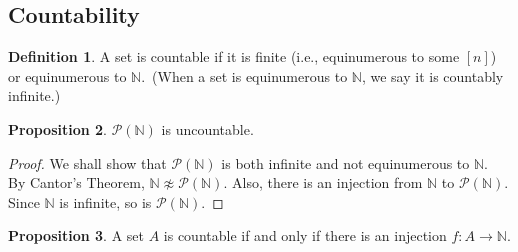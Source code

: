 \documentclass[14pt]{article}
\theoremstyle{definition}
\newtheorem{definition}{Definition}[subsection]
\newtheorem{proposition}[definition]{Proposition}
\newcommand{\fun}[3]{#1\colon #2\rightarrow#3}
\newcommand{\bb}[1]{\mathbb{#1}}
\begin{document}
\vspace{5mm}

\subsection{Countability}
\begin{definition}
    A set is countable if it is finite (i.e., equinumerous to some $[n]$) or equinumerous to $\bb{N}$.\
   (When a set is equinumerous to $\bb{N}$, we say it is countably infinite.)
\end{definition}

\vspace{2mm}

\begin{proposition}
    $\mathcal{P}(\bb{N})$ is uncountable.
\end{proposition}

\begin{proof}
    We shall show that  $\mathcal{P}(\bb{N})$ is both infinite and not equinumerous to $\bb{N}$.\\
    By Cantor's Theorem, $\bb{N}\not\approx\mathcal{P}(\bb{N})$. Also, there is an injection from
    $\bb{N}$ to $\mathcal{P}(\bb{N})$. Since $\bb{N}$ is infinite, so is $\mathcal{P}(\bb{N})$.

\end{proof}

\vspace{2mm}

\begin{proposition}
    A set $A$ is countable if and only if there is an injection $\fun{f}{A}{\bb{N}}$.
\end{proposition}
\end{document}
